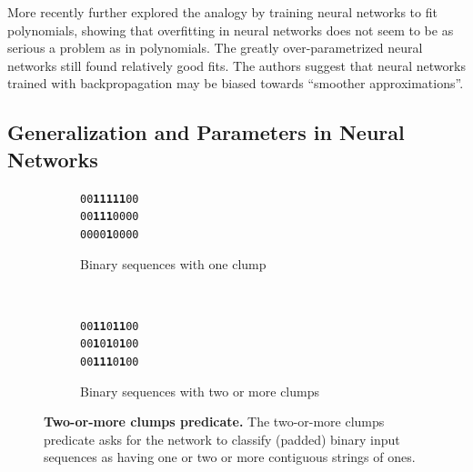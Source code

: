 \documentclass[thesis]{subfiles}
\begin{document}
    More recently \citet{caruana2001overfitting} further explored the analogy by training neural networks to fit polynomials, showing that overfitting in neural networks does not seem to be as serious a problem as in polynomials. The greatly over-parametrized neural networks still found relatively good fits. The authors suggest that neural networks trained with backpropagation may be biased towards ``smoother approximations''.
	
	
	\subsection{Generalization and Parameters in Neural Networks}
	\begin{figure}[tb]
		\centering
		\large
        \renewcommand{\ttdefault}{pcr}
		\begin{subfigure}[t]{0.45\textwidth}
			\begin{center}
			\texttt{00\textbf{11111}00}\\
			\texttt{00\textbf{111}0000}\\
			\texttt{0000\textbf{1}0000}
			\end{center}
			\caption{Binary sequences with one clump}
			\label{fig:oneclump}
		\end{subfigure}
		~
		\begin{subfigure}[t]{0.45\textwidth}
			\begin{center}
			\texttt{00\textbf{11}0\textbf{11}00}\\
			\texttt{00\textbf{1}0\textbf{1}0\textbf{1}00}\\
			\texttt{00\textbf{111}0\textbf{1}00}
			\end{center}
			\caption{Binary sequences with two or more clumps}
			\label{fig:twoclumps}
		\end{subfigure}
		
		\caption[Two-or-more clumps predicate]{\textbf{Two-or-more clumps predicate.} The two-or-more clumps predicate asks for the network to classify (padded) binary input sequences as having one or two or more contiguous strings of ones.}
		\label{fig:tomclumps}
	\end{figure}
	
\end{document}
